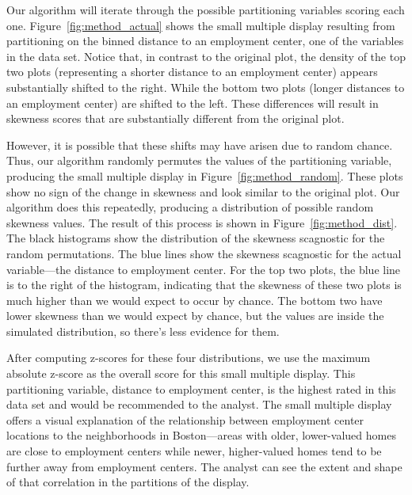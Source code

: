 Our algorithm will iterate through the possible partitioning variables scoring each one. Figure~\ref{fig:method_actual} shows the small multiple display resulting from partitioning on the binned distance to an employment center, one of the variables in the data set. Notice that, in contrast to the original plot, the density of the top two plots (representing a shorter distance to an employment center) appears substantially shifted to the right. While the bottom two plots (longer distances to an employment center) are shifted to the left. These differences will result in skewness scores that are substantially different from the original plot. 

However, it is possible that these shifts may have arisen due to random chance. Thus, our algorithm randomly permutes the values of the partitioning variable, producing the small multiple display in Figure~\ref{fig:method_random}. These plots show no sign of the change in skewness and look similar to the original plot. 
Our algorithm does this repeatedly, producing a distribution of possible random skewness values. The result of this process is shown in Figure~\ref{fig:method_dist}. The black histograms show the distribution of the skewness scagnostic for the random permutations. The blue lines show the skewness scagnostic for the actual variable---the distance to employment center. For the top two plots, the blue line is to the right of the histogram, indicating that the skewness of these two plots is much higher than we would expect to occur by chance. The bottom two have lower skewness than we would expect by chance, but the values are inside the simulated distribution, so there's less evidence for them.

After computing z-scores for these four distributions, we use the maximum absolute z-score as the overall score for this small multiple display. This partitioning variable, distance to employment center, is the highest rated in this data set and would be recommended to the analyst. The small multiple display offers a visual explanation of the relationship between employment center locations to the neighborhoods in Boston---areas with older, lower-valued homes are close to employment centers while newer, higher-valued homes tend to be further away from employment centers. The analyst can see the extent and shape of that correlation in the partitions of the display.
